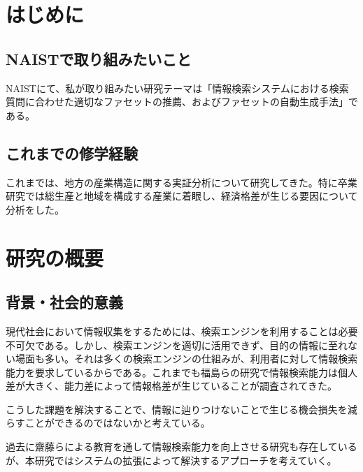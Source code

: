 \documentclass[a4j,12pt, twocolumn]{jarticle}
\begin{document}
\section{はじめに}
\subsection{NAISTで取り組みたいこと}
 NAISTにて、私が取り組みたい研究テーマは「情報検索システムにおける検索質問に合わせた適切なファセットの推薦、およびファセットの自動生成手法」である。
\subsection{これまでの修学経験}
 これまでは、地方の産業構造に関する実証分析について研究してきた。特に卒業研究では総生産と地域を構成する産業に着眼し、経済格差が生じる要因について分析をした。

\section{研究の概要}
\subsection{背景・社会的意義}
 現代社会において情報収集をするためには、検索エンジンを利用することは必要不可欠である。しかし、検索エンジンを適切に活用できず、目的の情報に至れない場面も多い。それは多くの検索エンジンの仕組みが、利用者に対して情報検索能力を要求しているからである。これまでも福島らの研究で情報検索能力は個人差が大きく、能力差によって情報格差が生じていることが調査されてきた\cite{fukushima}。

 こうした課題を解決することで、情報に辿りつけないことで生じる機会損失を減らすことができるのではないかと考えている。
 
 過去に齋藤らによる教育を通して情報検索能力を向上させる研究\cite{saito}も存在しているが、本研究ではシステムの拡張によって解決するアプローチを考えていく。
\end{document}
